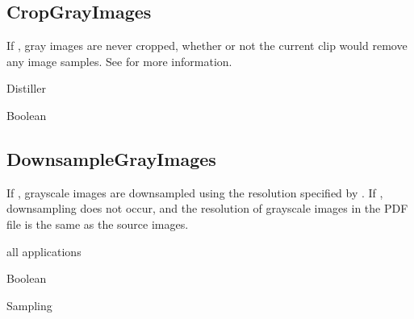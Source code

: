 \documentclass[letterpaper,12pt,english,openany,oneside]{sphinxmanual}
\begin{document}
\subsection{CropGrayImages}
\label{\detokenize{PDF_Create_CommonSettings:cropgrayimages}}
If  , gray images are never cropped, whether or not the current clip would remove any image samples. See  for more information.

\label{\detokenize{PDF_Create_CommonSettings:supported-by-38}}

Distiller

\label{\detokenize{PDF_Create_CommonSettings:type-38}}

Boolean

\label{\detokenize{PDF_Create_CommonSettings:default-value-35}}

\begin{sphinxVerbatim}[commandchars=\\\{\}]
\end{sphinxVerbatim}




\subsection{DownsampleGrayImages}
\label{\detokenize{PDF_Create_CommonSettings:downsamplegrayimages}}
If  , grayscale images are downsampled using the resolution specified by  . If  , downsampling does not occur, and the resolution of grayscale images in the PDF file is the same as the source images.

\label{\detokenize{PDF_Create_CommonSettings:supported-by-39}}

all applications

\label{\detokenize{PDF_Create_CommonSettings:type-39}}

Boolean

\label{\detokenize{PDF_Create_CommonSettings:ui-name-28}}

Sampling

\label{\detokenize{PDF_Create_CommonSettings:default-value-36}}
\end{document}
